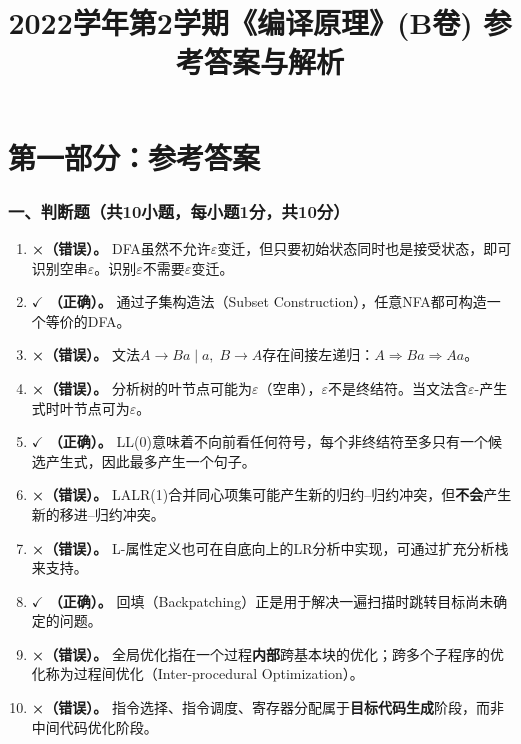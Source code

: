 \documentclass[12pt,a4paper,fontset=fandol]{ctexart}
\title{\bfseries 2022学年第2学期《编译原理》(B卷) 参考答案与解析}
\author{}
\date{}
\begin{document}
\maketitle
\thispagestyle{fancy}

\part*{第一部分：参考答案}

\section*{一、判断题（共10小题，每小题1分，共10分）}

\begin{enumerate}[label=\arabic*.]
    \item \textbf{×（错误）。} DFA虽然不允许$\varepsilon$变迁，但只要初始状态同时也是接受状态，即可识别空串$\varepsilon$。识别$\varepsilon$不需要$\varepsilon$变迁。
    \item \textbf{$\checkmark$ （正确）。} 通过子集构造法（Subset Construction），任意NFA都可构造一个等价的DFA。
    \item \textbf{×（错误）。} 文法$A \to Ba \mid a,\; B \to A$存在间接左递归：$A \Rightarrow Ba \Rightarrow Aa$。
    \item \textbf{×（错误）。} 分析树的叶节点可能为$\varepsilon$（空串），$\varepsilon$不是终结符。当文法含$\varepsilon$-产生式时叶节点可为$\varepsilon$。
    \item \textbf{$\checkmark$ （正确）。} LL(0)意味着不向前看任何符号，每个非终结符至多只有一个候选产生式，因此最多产生一个句子。
    \item \textbf{×（错误）。} LALR(1)合并同心项集可能产生新的归约--归约冲突，但\textbf{不会}产生新的移进--归约冲突。
    \item \textbf{×（错误）。} L-属性定义也可在自底向上的LR分析中实现，可通过扩充分析栈来支持。
    \item \textbf{$\checkmark$ （正确）。} 回填（Backpatching）正是用于解决一遍扫描时跳转目标尚未确定的问题。
    \item \textbf{×（错误）。} 全局优化指在一个过程\textbf{内部}跨基本块的优化；跨多个子程序的优化称为过程间优化（Inter-procedural Optimization）。
    \item \textbf{×（错误）。} 指令选择、指令调度、寄存器分配属于\textbf{目标代码生成}阶段，而非中间代码优化阶段。
\end{enumerate}
\end{document}
